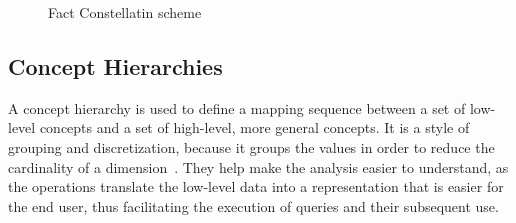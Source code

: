\begin{figure}[!htb]
  \caption{Fact Constellatin scheme}\label{fig:factconstschema}
  \vspace{6mm}
  \begin{center}
  \end{center}
  \vspace{2mm}
  \legenda{}
\end{figure}

\subsection{Concept Hierarchies}\label{ch:fun:cube:concept}

A concept hierarchy is used to define a mapping sequence between a set of low-level concepts and a set of high-level, more general concepts.
It is a style of grouping and discretization, because it groups the values in order to reduce the cardinality of a dimension~\cite{hanDataMiningConcepts2011}.
They help make the analysis easier to understand, as the operations translate the low-level data into a representation that is easier for the end user, thus facilitating the execution of queries and their subsequent use.

